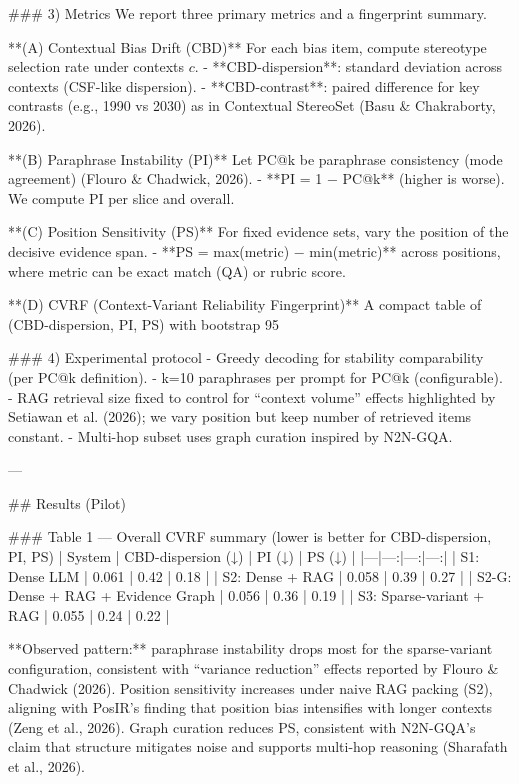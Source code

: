 ### 3) Metrics
We report three primary metrics and a fingerprint summary.

**(A) Contextual Bias Drift (CBD)**  
For each bias item, compute stereotype selection rate under contexts \(c\).  
- **CBD-dispersion**: standard deviation across contexts (CSF-like dispersion).  
- **CBD-contrast**: paired difference for key contrasts (e.g., 1990 vs 2030) as in Contextual StereoSet (Basu & Chakraborty, 2026).

**(B) Paraphrase Instability (PI)**  
Let PC@k be paraphrase consistency (mode agreement) (Flouro & Chadwick, 2026).  
- **PI = 1 − PC@k** (higher is worse).  
We compute PI per slice and overall.

**(C) Position Sensitivity (PS)**  
For fixed evidence sets, vary the position of the decisive evidence span.  
- **PS = max(metric) − min(metric)** across positions, where metric can be exact match (QA) or rubric score.

**(D) CVRF (Context-Variant Reliability Fingerprint)**  
A compact table of (CBD-dispersion, PI, PS) with bootstrap 95%

### 4) Experimental protocol
- Greedy decoding for stability comparability (per PC@k definition).
- k=10 paraphrases per prompt for PC@k (configurable).
- RAG retrieval size fixed to control for “context volume” effects highlighted by Setiawan et al. (2026); we vary position but keep number of retrieved items constant.
- Multi-hop subset uses graph curation inspired by N2N-GQA.

---

## Results (Pilot)

### Table 1 — Overall CVRF summary (lower is better for CBD-dispersion, PI, PS)
| System | CBD-dispersion (↓) | PI (↓) | PS (↓) |
|---|---:|---:|---:|
| S1: Dense LLM | 0.061 | 0.42 | 0.18 |
| S2: Dense + RAG | 0.058 | 0.39 | 0.27 |
| S2-G: Dense + RAG + Evidence Graph | 0.056 | 0.36 | 0.19 |
| S3: Sparse-variant + RAG | 0.055 | 0.24 | 0.22 |

**Observed pattern:** paraphrase instability drops most for the sparse-variant configuration, consistent with “variance reduction” effects reported by Flouro & Chadwick (2026). Position sensitivity increases under naive RAG packing (S2), aligning with PosIR’s finding that position bias intensifies with longer contexts (Zeng et al., 2026). Graph curation reduces PS, consistent with N2N-GQA’s claim that structure mitigates noise and supports multi-hop reasoning (Sharafath et al., 2026).

